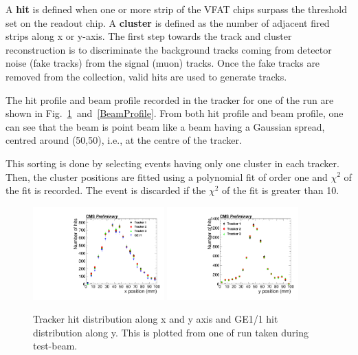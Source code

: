 A \textbf{hit} is defined when one or more strip of the VFAT chips surpass the threshold set on the readout chip. 
A \textbf{cluster} is defined as the number of adjacent fired strips along x or y-axis. The first step towards the track and cluster reconstruction is to discriminate the background tracks coming from detector noise (fake tracks) from the signal (muon) tracks. Once the fake tracks are removed from the collection, valid hits are used to generate tracks.

The hit profile and beam profile recorded in the tracker for one of the run are shown in Fig.~\ref{HitPosXaxis}~and~\ref{BeamProfile}.
From both hit profile and beam profile, one can see that the beam is point beam like a beam having a Gaussian spread, centred around (50,50), i.e., at the centre of the tracker.

This sorting is done by selecting events having only one cluster in each tracker. Then, the cluster positions are fitted using a polynomial fit of order one and $\chi^2$ of the fit is recorded.
The event is discarded if the $\chi^2$ of the fit is greater than 10.
\begin{figure}[!htbp]
\centering
\includegraphics[width=0.45\textwidth]{figures/GEM/Tracker_Hit_position_Run1644_x.pdf}%
\includegraphics[width=0.45\textwidth]{figures/GEM/Tracker_Hit_position_Run1644_y.pdf}
\caption{Tracker hit distribution along x and y axis and GE1/1 hit distribution along y. This is plotted from one of run taken during test-beam.}
\label{HitPosXaxis}
\end{figure}
